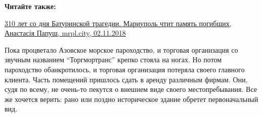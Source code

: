 \textbf{Читайте также:}

\href{https://mrpl.city/news/view/310-let-so-dnya-baturinskoj-tragedii-mariupol-chtit-pamyat-pogibshih}{%
310 лет со дня Батуринской трагедии. Мариуполь чтит память погибших, Анастасія Папуш, mrpl.city, 02.11.2018}

Пока процветало Азовское морское пароходство, и торговая организация со звучным
названием \enquote{Торгмортранс} крепко стояла на ногах. Но потом пароходство
обанкротилось, и торговая организация потеряла своего главного клиента. Часть
помещений пришлось сдать в аренду различным фирмам. Они, судя по всему, не
очень-то пекутся о внешнем виде своего местопребывания. Все же хочется верить:
рано или поздно историческое здание обретет первоначальный вид.
